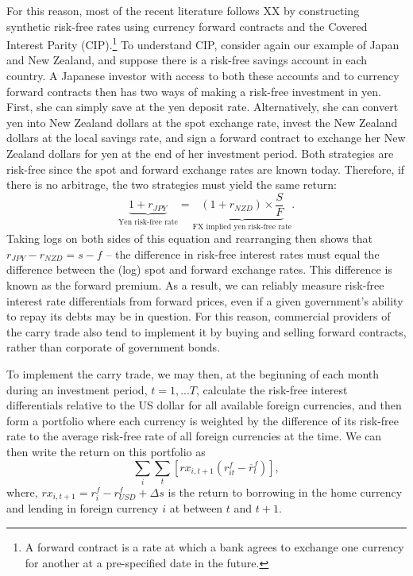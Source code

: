 \documentclass{ar-1col}
\begin{document}
For this reason, most of the recent literature follows XX by
constructing synthetic risk-free rates using currency forward
contracts and the Covered Interest Parity (CIP).\footnote{A forward
  contract is a rate at which a bank agrees to exchange one currency
  for another at a pre-specified date in the future.} To understand
CIP, consider again our example of Japan and New Zealand, and suppose
there is a risk-free savings account in each country. A Japanese
investor with access to both these accounts and to currency forward
contracts then has two ways of making a risk-free investment in yen.
First, she can simply save at the yen deposit rate. Alternatively, she
can convert yen into New Zealand dollars at the spot exchange rate,
invest the New Zealand dollars at the local savings rate, and sign a
forward contract to exchange her New Zealand dollars for yen at the
end of her investment period. Both strategies are risk-free since the
spot and forward exchange rates are known today. Therefore, if there
is no arbitrage, the two strategies must yield the same return:
\begin{equation}
  \underbrace{1 + r_{JPY}}_{\text{Yen risk-free rate}}
  = \underbrace{
    (1 + r_{NZD}) \times \frac{S}{F}
  }_{\text{FX implied yen risk-free rate}}.
\end{equation}
Taking logs on both sides of this equation and rearranging then shows
that $r_{JPY}-r_{NZD}=s-f$ -- the difference in risk-free interest
rates must equal the difference between the (log) spot and forward
exchange rates. This difference is known as the forward premium. As a
result, we can reliably measure risk-free interest rate differentials
from forward prices, even if a given government's ability to repay its
debts may be in question. For this reason, commercial providers of the
carry trade also tend to implement it by buying and selling forward
contracts, rather than corporate of government bonds.


To implement the carry trade, we may then, at the beginning of each
month during an investment period, $t=1,...T$, calculate the risk-free
interest differentials relative to the US dollar for all available
foreign currencies, and then form a portfolio where each currency is
weighted by the difference of its risk-free rate to the average
risk-free rate of all foreign currencies at the time. We can then
write the return on this portfolio as
\begin{equation}\label{eq_carry}
  \textstyle\sum_{i}\sum_t\left[ rx_{i,t+1}\left( r^f_{it}-\overline{r}^f_{t}\right) \right] ,
  \label{eq_CT}
\end{equation}%
where, $rx_{i,t+1}=r^f_i-r^f_{USD}+\Delta s$ is the return to
borrowing in the home currency and lending in foreign currency $i$ at
between $t$ and $t+1$.
\end{document}
